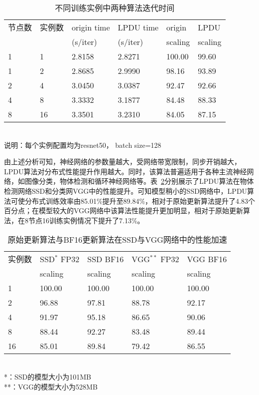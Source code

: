 \begin{table}[htbp]
  \centering
  \caption{不同训练实例中两种算法迭代时间}
  \label{tab:fp32_bf16_real_iter_time}
  \begin{minipage}[t]{0.9\textwidth} 
    \begin{tabularx}{\linewidth}{|l|X|X|X|X|X|}
      \hline
      节点数 & 实例数 & origin time & LPDU time & origin & LPDU \\
       &  & (s/iter) & (s/iter) & scaling & scaling\\
      \hline
1 & 1 & 2.8158 & 2.8271 & 100.00 & 99.60 \\
1 & 2 & 2.8685 & 2.9990 & 98.16 & 93.89 \\
2 & 4 & 3.0450 & 3.0387 & 92.47 & 92.66 \\
4 & 8 & 3.3332 & 3.1877 & 84.48 & 88.33 \\
8 & 16 & 3.3501 & 3.2310 & 84.05 & 87.15 \\
      \hline
    \end{tabularx}\\[2pt]
    \footnotesize
    说明：每个实例配置均为resnet50， batch size=128\\
  \end{minipage}
\end{table}

由上述分析可知，神经网络的参数量越大，受网络带宽限制，同步开销越大，LPDU算法对分布式性能提升作用越大。同时，该算法普遍适用于各种主流神经网络，如图像分类，物体检测和循环神经网络等。表~\ref{tab:ssd_vgg_scaling}分别展示了LPDU算法在物体检测网络SSD和分类网VGG中的性能提升。可知模型稍小的SSD网络中，LPDU算法可使分布式训练效率由85.01\%提升至89.84\%，相对于原始更新算法提升了4.83个百分点；在模型较大的VGG网络中该算法性能提升更加明显，相对于原始更新算法，在8节点16训练实例情况下提升了7.13\%。
\begin{table}[htbp]
  \centering
  \caption{原始更新算法与BF16更新算法在SSD与VGG网络中的性能加速}
  \label{tab:ssd_vgg_scaling}
  \begin{minipage}[t]{0.8\textwidth} 
    \begin{tabularx}{\linewidth}{|l|X|X|X|X|}
      \hline
      实例数 & SSD$^{*}$ FP32 & SSD BF16 & VGG$^{**}$ FP32 & VGG BF16 \\
       & scaling & scaling & scaling & scaling\\
      \hline
1 & 100.00 & 100.00 & 100.00 & 100.00 \\
2 & 96.88 & 97.81 & 88.78 & 92.17 \\
4 & 91.97 & 95.18 & 86.65 & 90.06 \\
8 & 88.44 & 92.27 & 83.48 & 89.44 \\
16 & 85.01 & 89.84 & 79.42 & 86.55 \\
      \hline
    \end{tabularx}\\[2pt]
    \footnotesize
    *：SSD的模型大小为101MB\\
    **：VGG的模型大小为528MB
  \end{minipage}
\end{table}

